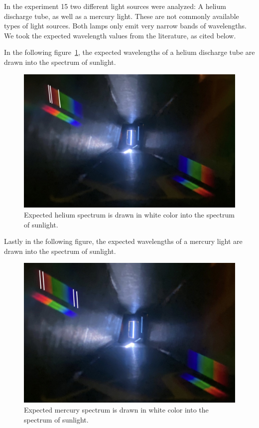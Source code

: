 In the experiment 15 two different light sources were analyzed: A helium discharge tube, as well as
a mercury light. These are not commonly available types of light sources. Both lamps only emit very narrow bands
of wavelengths. We took the expected wavelength values from the literature, as cited below.

In the following figure~\ref{fig_helium_spectrum}, the expected wavelengths of a helium discharge tube are 
drawn into the spectrum of sunlight.~\cite{Helium Discharge Tube}
\begin{figure}[H]
    \centering
    \includegraphics[scale = 0.23]{src/images/helium_spectrum.jpg}
    \caption{Expected helium spectrum is drawn in white color into the spectrum of sunlight.}\label{fig_helium_spectrum}
\end{figure}
\vspace{-1em}
Lastly in the following figure, the expected wavelengths of a mercury light are drawn into the spectrum of sunlight.~\cite{Mercury Vapor Lamp}
\begin{figure}[H]
    \centering
    \includegraphics[scale = 0.2]{src/images/mercury_spectrum.jpg}
    \caption{Expected mercury spectrum is drawn in white color into the spectrum of sunlight.}\label{fig_mercury_spectrum}
\end{figure}